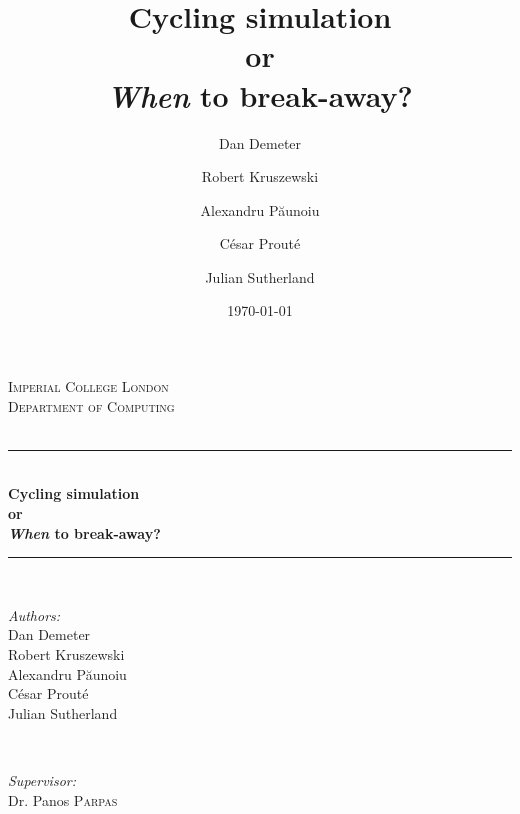 \documentclass[10pt, a4paper]{report}
\title{Cycling simulation\\or\\\textit{When} to break-away?}
\date{\today}
\author{Dan Demeter\and Robert Kruszewski\and Alexandru P\u{a}unoiu \and C\'esar Prout\'e \and Julian Sutherland}
\begin{document}
\begin{titlepage}

\newcommand{\HRule}{\rule{\linewidth}{0.5mm}} %

\center %


\textsc{\LARGE Imperial College London}\\[1.5cm] %
\textsc{\Large Department of Computing}\\[0.5cm] %
\textsc{\large}\\[0.5cm] %


\HRule \\[0.4cm]
{ \huge \bfseries Cycling simulation\\or\\\vspace{0.4cm}\textit{When} to break-away?}\\[0.4cm] %
\HRule \\[1.5cm]


\begin{minipage}{0.4\textwidth}
\begin{flushleft} \large
\emph{Authors:}\\
Dan Demeter \\
Robert Kruszewski\\
Alexandru P\u{a}unoiu\\
C\'esar Prout\'e\\
Julian Sutherland
\end{flushleft}
\end{minipage}
~
\begin{minipage}{0.4\textwidth}
\begin{flushright} \large
\emph{Supervisor:} \\
Dr. Panos \textsc{Parpas} \\%
\end{flushright}
\end{minipage}\\[5cm]


\end{titlepage}
\end{document}
